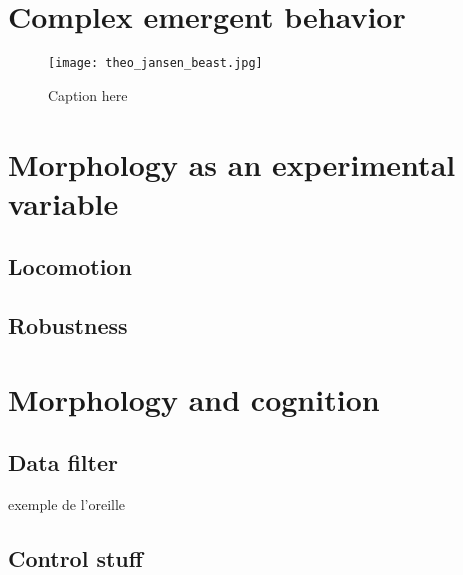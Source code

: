 \section{Complex emergent behavior} %


\begin{figure}[]
\centering
    \hfil
    \hfil
    \caption{}
    \label{fig:}
\end{figure}


\begin{figure}[]
    \begin{center}
        \texttt{[image: theo\_jansen\_beast.jpg]}
    \end{center}
    \caption{Caption here}
    \label{fig:figure1}
\end{figure}



\section{Morphology as an experimental variable} %
\label{sec:morphology_as_an_experimental_variable}



\subsection{Locomotion} %

\subsection{Robustness} %


\section{Morphology and cognition} %

\subsection{Data filter} %

exemple de l'oreille

\subsection{Control stuff} %


